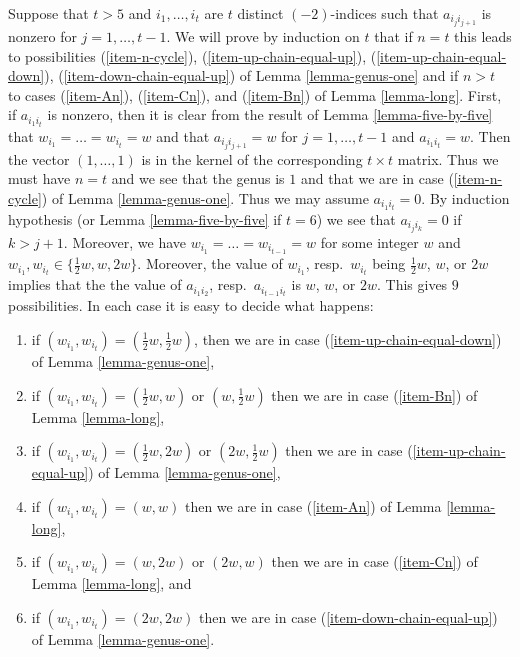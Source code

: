 \noindent
Suppose that $t > 5$ and $i_1, \ldots, i_t$ are $t$ distinct $(-2)$-indices
such that $a_{i_ji_{j + 1}}$ is nonzero for $j = 1, \ldots, t - 1$. We will
prove by induction on $t$ that if $n = t$ this leads to possibilities
(\ref{item-n-cycle}), (\ref{item-up-chain-equal-up}),
(\ref{item-up-chain-equal-down}), (\ref{item-down-chain-equal-up})
of Lemma \ref{lemma-genus-one} and if $n > t$ to cases
(\ref{item-An}), (\ref{item-Cn}), and (\ref{item-Bn}) of
Lemma \ref{lemma-long}.
First, if $a_{i_1i_t}$ is nonzero, then it is clear from
the result of Lemma \ref{lemma-five-by-five} that
$w_{i_1} = \ldots = w_{i_t} = w$ and that
$a_{i_ji_{j + 1}} = w$ for $j = 1, \ldots, t - 1$ and
$a_{i_1i_t} = w$. Then the vector $(1, \ldots, 1)$ is in the kernel
of the corresponding $t \times t$ matrix. Thus we must have $n = t$
and we see that the genus is $1$ and that we are
in case (\ref{item-n-cycle}) of Lemma \ref{lemma-genus-one}.
Thus we may assume $a_{i_1i_t} = 0$.
By induction hypothesis (or Lemma \ref{lemma-five-by-five} if $t = 6$)
we see that $a_{i_ji_k} = 0$ if $k > j + 1$.
Moreover, we have $w_{i_1} = \ldots = w_{i_{t - 1}} = w$
for some integer $w$ and $w_{i_1}, w_{i_t} \in \{\frac{1}{2}w, w, 2w\}$.
Moreover, the value of $w_{i_1}$, resp.\ $w_{i_t}$ being
$\frac{1}{2}w$, $w$, or $2w$ implies that the
the value of $a_{i_1i_2}$, resp.\ $a_{i_{t - 1}i_t}$
is $w$, $w$, or $2w$. This gives $9$ possibilities.
In each case it is easy to decide what happens:
\begin{enumerate}
\item if $(w_{i_1}, w_{i_t}) = (\frac{1}{2}w, \frac{1}{2}w)$, then
we are in case (\ref{item-up-chain-equal-down}) of
Lemma \ref{lemma-genus-one},
\item if $(w_{i_1}, w_{i_t}) = (\frac{1}{2}w, w)$ or $(w, \frac{1}{2}w)$
then we are in case (\ref{item-Bn}) of Lemma \ref{lemma-long},
\item if $(w_{i_1}, w_{i_t}) = (\frac{1}{2}w, 2w)$ or $(2w, \frac{1}{2}w)$
then we are in case (\ref{item-up-chain-equal-up}) of
Lemma \ref{lemma-genus-one},
\item if $(w_{i_1}, w_{i_t}) = (w, w)$ then we are in case
(\ref{item-An}) of Lemma \ref{lemma-long},
\item if $(w_{i_1}, w_{i_t}) = (w, 2w)$ or $(2w, w)$ then we are
in case (\ref{item-Cn}) of Lemma \ref{lemma-long}, and
\item if $(w_{i_1}, w_{i_t}) = (2w, 2w)$ then we are in case
(\ref{item-down-chain-equal-up}) of Lemma \ref{lemma-genus-one}.
\end{enumerate}

